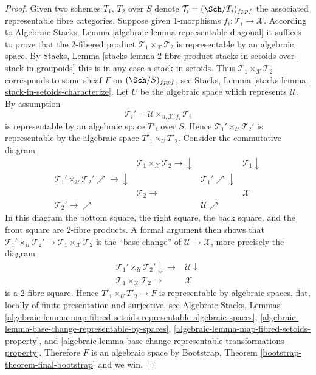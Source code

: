 \begin{proof}
Given two schemes $T_1$, $T_2$ over $S$ denote
$\mathcal{T}_i = (\Sch/T_i)_{fppf}$ the associated representable
fibre categories. Suppose given $1$-morphisms
$f_i : \mathcal{T}_i \to \mathcal{X}$.
According to
Algebraic Stacks, Lemma \ref{algebraic-lemma-representable-diagonal}
it suffices to prove that the $2$-fibered
product $\mathcal{T}_1 \times_\mathcal{X} \mathcal{T}_2$
is representable by an algebraic space. By
Stacks, Lemma
\ref{stacks-lemma-2-fibre-product-stacks-in-setoids-over-stack-in-groupoids}
this is in any case a stack in setoids. Thus
$\mathcal{T}_1 \times_\mathcal{X} \mathcal{T}_2$ corresponds
to some sheaf $F$ on $(\Sch/S)_{fppf}$, see
Stacks, Lemma \ref{stacks-lemma-stack-in-setoids-characterize}.
Let $U$ be the algebraic space which represents $\mathcal{U}$.
By assumption
$$
\mathcal{T}_i' = \mathcal{U} \times_{u, \mathcal{X}, f_i} \mathcal{T}_i
$$
is representable by an algebraic space $T'_i$ over $S$. Hence
$\mathcal{T}_1' \times_\mathcal{U} \mathcal{T}_2'$ is representable
by the algebraic space $T'_1 \times_U T'_2$.
Consider the commutative diagram
$$
\begin{array}{cccc} & \mathcal{T}_1 \times_{\mathcal X} \mathcal{T}_2 \longrightarrow\downarrow &  & \mathcal{T}_1 \downarrow \\ \mathcal{T}_1' \times_\mathcal{U} \mathcal{T}_2' \nearrow\longrightarrow\downarrow &  & \mathcal{T}_1' \nearrow\downarrow &  \\  & \mathcal{T}_2 \longrightarrow &  & \mathcal X \\ \mathcal{T}_2' \longrightarrow\nearrow &  & \mathcal{U} \nearrow & \end{array}
$$
In this diagram the bottom square, the right square, the back square, and
the front square are $2$-fibre products. A formal argument then shows
that $\mathcal{T}_1' \times_\mathcal{U} \mathcal{T}_2' \to
\mathcal{T}_1 \times_{\mathcal X} \mathcal{T}_2$
is the ``base change'' of $\mathcal{U} \to \mathcal{X}$, more precisely
the diagram
$$
\begin{array}{cc}\mathcal{T}_1' \times_\mathcal{U} \mathcal{T}_2' \downarrow\longrightarrow & \mathcal{U} \downarrow \\ \mathcal{T}_1 \times_{\mathcal X} \mathcal{T}_2 \longrightarrow & \mathcal{X}\end{array}
$$
is a $2$-fibre square.
Hence $T'_1 \times_U T'_2 \to F$ is representable by algebraic spaces,
flat, locally of finite presentation and surjective, see
Algebraic Stacks, Lemmas
\ref{algebraic-lemma-map-fibred-setoids-representable-algebraic-spaces},
\ref{algebraic-lemma-base-change-representable-by-spaces},
\ref{algebraic-lemma-map-fibred-setoids-property}, and
\ref{algebraic-lemma-base-change-representable-transformations-property}.
Therefore $F$ is an algebraic space by
Bootstrap, Theorem \ref{bootstrap-theorem-final-bootstrap}
and we win.
\end{proof}

